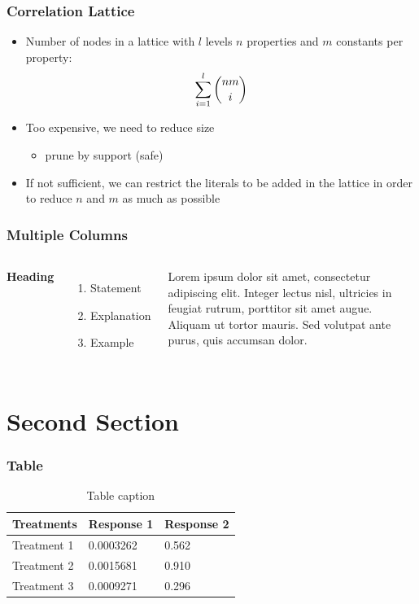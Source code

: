 \documentclass{beamer}
\begin{document}
\begin{frame}
\frametitle{Correlation Lattice}
  \begin{itemize}
     \item Number of nodes in a lattice with $l$ levels $n$ properties and $m$ constants per property:
      \begin{equation}
	\sum_{i=1}^l \dbinom{nm}{i}
      \end{equation}
      \item Too expensive, we need to reduce size 
      \begin{itemize}
	\item prune by support (safe)
      \end{itemize}
      \item If not sufficient, we can restrict the literals to be added in the lattice in order to reduce $n$ and $m$
as much as possible
  \end{itemize}
\end{frame}


\begin{frame}
\frametitle{Multiple Columns}
\begin{columns}[c] %

\textbf{Heading}
\begin{enumerate}
\item Statement
\item Explanation
\item Example
\end{enumerate}

Lorem ipsum dolor sit amet, consectetur adipiscing elit. Integer lectus nisl, ultricies in feugiat rutrum, porttitor sit amet augue. Aliquam ut tortor mauris. Sed volutpat ante purus, quis accumsan dolor.

\end{columns}
\end{frame}

\section{Second Section}

\begin{frame}
\frametitle{Table}
\begin{table}
\begin{tabular}{l l l}
\toprule
\textbf{Treatments} & \textbf{Response 1} & \textbf{Response 2}\\
\midrule
Treatment 1 & 0.0003262 & 0.562 \\
Treatment 2 & 0.0015681 & 0.910 \\
Treatment 3 & 0.0009271 & 0.296 \\
\bottomrule
\end{tabular}
\caption{Table caption}
\end{table}
\end{frame}
\end{document}
